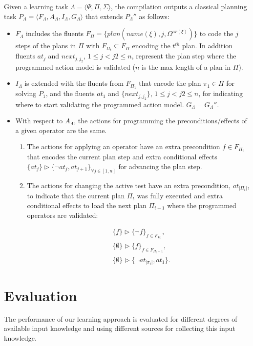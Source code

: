 \documentclass[letterpaper]{article} %
\newcommand{\tup}[1]{{\langle #1 \rangle}}
\begin{document}
Given a learning task $\Lambda=\tup{\Psi,\Pi,\Sigma}$, the compilation outputs a classical planning task $P_{\Lambda}=\tup{F_{\Lambda},A_{\Lambda},I_{\Lambda},G_{\Lambda}}$ that extends $P_{\Lambda}''$ as follows: 
\begin{itemize}
\item $F_{\Lambda}$ includes the fluents $F_{\Pi}=\{plan(name(\xi),j,\Omega^{ar(\xi)})\}$ to code the $j$ steps of the plans in $\Pi$ with $F_{\Pi_t}\subseteq F_{\Pi}$ encoding the $t^{th}$ plan. In addition fluents $at_j$ and $next_{j,j_2}$, {\small $1\leq j<j2\leq n$}, represent the plan step where the programmed action model is validated ($n$ is the max length of a plan in $\Pi$).
\item $I_{\Lambda}$ is extended with the fluents from $F_{\Pi_1}$ that encode the plan $\pi_1\in \Pi$ for solving $P_1$, and the fluents $at_1$ and $\{next_{j,j_2}\}$, {\small $1\leq j<j2\leq n$}, for indicating where to start validating the programmed action model. $G_{\Lambda}=G_{\Lambda}''$.
\item With respect to $A_{\Lambda}$, the actions for programming the preconditions/effects of a given operator are the same.
\begin{enumerate}
\item The actions for applying an operator have an extra precondition $f\in F_{\Pi_t}$ that encodes the current plan step and extra conditional effects $\{at_{j}\}\rhd\{\neg at_{j},at_{j+1}\}_{\forall j\in [1,n]}$ for advancing the plan step.
\item The actions for changing the active test have an extra precondition, $at_{|\Pi_t|}$, to indicate that the current plan $\Pi_t$ was fully executed and extra conditional effects to load the next plan $\Pi_{t+1}$ where the programmed operators are validated:
\begin{small}
\begin{align*}
&\{f\}\rhd\{\neg f\}_{f\in F_{\Pi_t}},\\
&\{\emptyset\}\rhd\{f\}_{f\in F_{\Pi_t+1}},\\
&\{\emptyset\}\rhd\{\neg at_{|\pi_t|},at_1\}.
\end{align*}
\end{small}
\end{enumerate}
\end{itemize}


\section{Evaluation}
The performance of our learning approach is evaluated for different degrees of available input knowledge and using different sources for collecting this input knowledge. 
\end{document}
